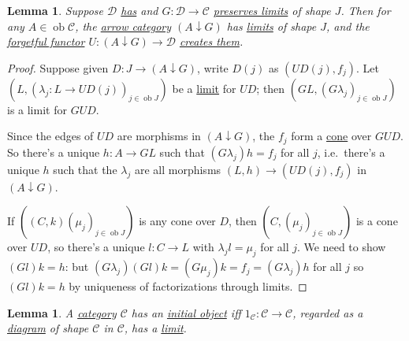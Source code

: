 \documentclass{article}
\DeclareMathOperator{\ob}{ob}
\newtheorem{nlemma}[nthm]{Lemma}
\begin{document}
\begin{nlemma}\label{lem:4.10}
  Suppose $\mathscr{D}$ \hyperlink{def:haslimits}{has} and $G: \mathscr{D} \to \mathscr{C}$ \hyperlink{def:plim}{preserves limits} of shape $J$.
  Then for any $A \in \ob \mathscr{C}$, the \hyperlink{def:comma}{arrow category} $(A \downarrow G)$ has \hyperlink{def:limit}{limits} of shape $J$, and the \hyperlink{def:forgFunc}{forgetful functor} $U: (A \downarrow G) \to \mathscr{D}$ \hyperlink{def:clim}{creates them}.
\end{nlemma}
\begin{proof}
  Suppose given $D : J \to (A \downarrow G)$, write $D(j)$ as $(U D(j), f_j)$.
  Let $(L, (\lambda_j: L \to U D(j))_{j \in \ob J})$ be a \hyperlink{def:limit}{limit} for $UD$;
  then $(GL, (G\lambda_j)_{j \in \ob J})$ is a limit for $GUD$.

  Since the edges of $UD$ are morphisms in $(A \downarrow G)$, the $f_j$ form a \hyperlink{def:cone}{cone} over $GUD$.
  So there's a unique $h: A \to GL$ such that $(G\lambda_j) h = f_j$ for all $j$,
  i.e.\ there's a unique $h$ such that the $\lambda_j$ are all morphisms $(L,h) \to (UD(j), f_j)$ in $(A \downarrow G)$.

  If $((C, k) (\mu_j)_{j \in \ob J})$ is any cone over $D$, then $(C, (\mu_j)_{j \in \ob J})$ is a cone over $UD$, so there's a unique $l: C \to L$ with $\lambda_j l = \mu_j$ for all $j$.
  We need to show $(Gl)k = h$:
  but $(G\lambda_j) (Gl) k = (G\mu_j) k = f_j = (G\lambda_j) h$
  for all $j$ so $(Gl)k = h$ by uniqueness of factorizations through limits.
\end{proof}
\begin{nlemma}\label{lem:4.11}
  A \hyperlink{def:cat}{category} $\mathscr{C}$ has an \hyperlink{def:initial}{initial object} iff $1_\mathscr{C}: \mathscr{C} \to \mathscr{C}$, regarded as a \hyperlink{def:diagram}{diagram} of shape $\mathscr{C}$ in $\mathscr{C}$, has a \hyperlink{def:limit}{limit}.
\end{nlemma}
\end{document}
